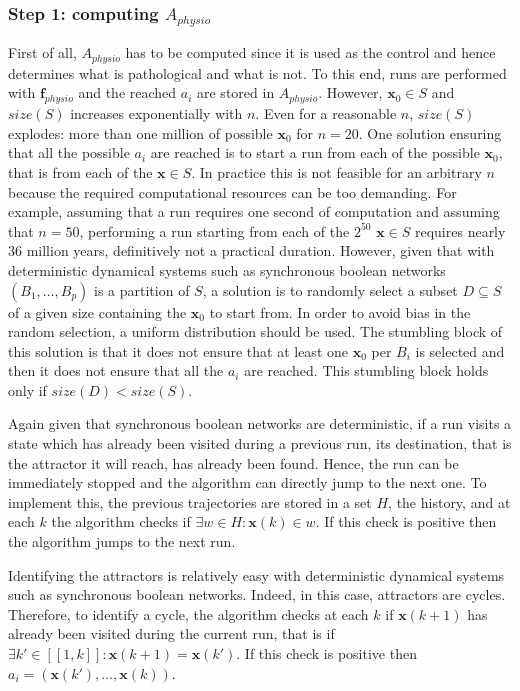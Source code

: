 \documentclass[oneside,a4paper,onecolumn,notitlepage]{article}
\begin{document}
\subsubsection{Step 1: computing $A_{physio}$}
First of all, $A_{physio}$ has to be computed since it is used as the control and hence determines what is pathological and what is not. To this end, runs are performed with $\boldsymbol{f}_{physio}$ and the reached $a_i$ are stored in $A_{physio}$. However, $\boldsymbol{x}_0\in S$ and $size(S)$ increases exponentially with $n$. Even for a reasonable $n$, $size(S)$ explodes: more than one million of possible $\boldsymbol{x}_0$ for $n=20$. One solution ensuring that all the possible $a_i$ are reached is to start a run from each of the possible $\boldsymbol{x}_0$, that is from each of the $\boldsymbol{x}\in S$. In practice this is not feasible for an arbitrary $n$ because the required computational resources can be too demanding. For example, assuming that a run requires one second of computation and assuming that $n=50$, performing a run starting from each of the $2^{50}$ $\boldsymbol{x}\in S$ requires nearly 36 million years, definitively not a practical duration. However, given that with deterministic dynamical systems such as synchronous boolean networks $(B_1,\dots,B_p)$ is a partition of $S$, a solution is to randomly select a subset $D\subseteq S$ of a given size containing the $\boldsymbol{x}_0$ to start from. In order to avoid bias in the random selection, a uniform distribution should be used. The stumbling block of this solution is that it does not ensure that at least one $\boldsymbol{x}_0$ per $B_i$ is selected and then it does not ensure that all the $a_i$ are reached. This stumbling block holds only if $size(D)<size(S)$.

Again given that synchronous boolean networks are deterministic, if a run visits a state which has already been visited during a previous run, its destination, that is the attractor it will reach, has already been found. Hence, the run can be immediately stopped and the algorithm can directly jump to the next one. To implement this, the previous trajectories are stored in a set $H$, the history, and at each $k$ the algorithm checks if $\exists w\in H: \boldsymbol{x}(k)\in w$. If this check is positive then the algorithm jumps to the next run.

Identifying the attractors is relatively easy with deterministic dynamical systems such as synchronous boolean networks. Indeed, in this case, attractors are cycles. Therefore, to identify a cycle, the algorithm checks at each $k$ if $\boldsymbol{x}(k+1)$ has already been visited during the current run, that is if $\exists k'\in [\![1,k]\!]: \boldsymbol{x}(k+1)=\boldsymbol{x}(k')$. If this check is positive then $a_i=(\boldsymbol{x}(k'),\dots ,\boldsymbol{x}(k))$.
\end{document}
